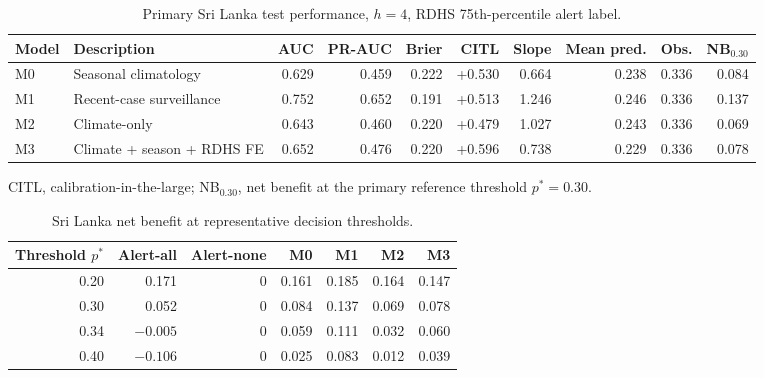 \documentclass[11pt,a4paper]{article}
\begin{document}
\begin{table}[htbp]
\centering
\caption{Primary Sri Lanka test performance, $h=4$, RDHS 75th-percentile alert label.}
\label{tab:slprimary}
\begin{threeparttable}\footnotesize
\setlength{\tabcolsep}{3.6pt}
\begin{tabular}{llrrrrrrrr}
\toprule
Model & Description & AUC & PR-AUC & Brier & CITL & Slope & Mean pred. & Obs. & NB$_{0.30}$ \\
\midrule
M0 & Seasonal climatology & 0.629 & 0.459 & 0.222 & +0.530 & 0.664 & 0.238 & 0.336 & 0.084 \\
M1 & Recent-case surveillance & 0.752 & 0.652 & 0.191 & +0.513 & 1.246 & 0.246 & 0.336 & 0.137 \\
M2 & Climate-only & 0.643 & 0.460 & 0.220 & +0.479 & 1.027 & 0.243 & 0.336 & 0.069 \\
M3 & Climate + season + RDHS FE & 0.652 & 0.476 & 0.220 & +0.596 & 0.738 & 0.229 & 0.336 & 0.078 \\
\bottomrule
\end{tabular}
\begin{tablenotes}\footnotesize
\item CITL, calibration-in-the-large; NB$_{0.30}$, net benefit at the primary reference threshold $p^*=0.30$.
\end{tablenotes}
\end{threeparttable}
\end{table}

\begin{table}[htbp]
\centering
\caption{Sri Lanka net benefit at representative decision thresholds.}
\label{tab:slthresh}
\small
\begin{tabular}{rrrrrrr}
\toprule
Threshold $p^*$ & Alert-all & Alert-none & M0 & M1 & M2 & M3 \\
\midrule
0.20 & 0.171 & 0 & 0.161 & 0.185 & 0.164 & 0.147 \\
0.30 & 0.052 & 0 & 0.084 & 0.137 & 0.069 & 0.078 \\
0.34 & $-0.005$ & 0 & 0.059 & 0.111 & 0.032 & 0.060 \\
0.40 & $-0.106$ & 0 & 0.025 & 0.083 & 0.012 & 0.039 \\
\bottomrule
\end{tabular}
\end{table}
\end{document}
